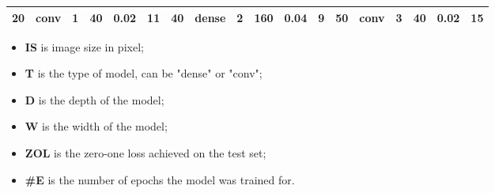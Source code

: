 \begin{table}
{\begin{tabular}{@{}llllll|llllll|llllll@{}}
20                              & conv                           & 1                              & 40                             & 0.02                             & 11                                & 40                              & dense                          & 2                              & 160                            & 0.04                           & 9                                 & 50                              & conv                           & 3                              & 40                             & 0.02                           & 15                               \\ \bottomrule
\end{tabular}}
\begin{itemize}
    \setlength\itemsep{0pt}
    \item[] \textbf{IS} is image size in pixel;
    \item[] \textbf{T} is the type of model, can be "dense" or "conv";
    \item[] \textbf{D} is the depth of the model;
    \item[] \textbf{W} is the width of the model;
    \item[] \textbf{ZOL} is the zero-one loss achieved on the test set;
    \item[] \textbf{\#E} is the number of epochs the model was trained for.
\end{itemize}
\end{table}
